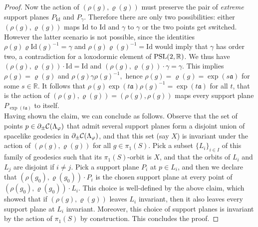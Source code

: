 \begin{proof}
    Now the action of $(\rho(g),\varrho(g))$ must preserve the pair of \textit{extreme} support planes $P_{\text{Id}}$ and $P_\gamma$. Therefore there are only two possibilities: either $(\rho(g),\varrho(g))$ maps $\text{Id}$ to $\text{Id}$ and $\gamma$ to $\gamma$ or the two points get switched. However the latter scenario is not possible, since the identities $\rho(g)\varrho\text{Id}(g)^{-1}=\gamma$ and $\rho(g)\varrho(g)^{-1}=\text{Id}$ would imply that $\gamma$ has order two, a contradiction for a loxodormic element of $\text{PSL}(2,\mathbb{R})$. We thus have $(\rho(g),\varrho(g))\cdot \text{Id}=\text{Id}$ and $(\rho(g),\varrho(g))\cdot\gamma=\gamma$. This implies $\rho(g)=\varrho(g)$ and $\rho(g)\gamma\rho(g)^{-1},$ hence $\rho(g)=\varrho(g)=\exp(s\mathfrak{a})$ for some $s\in\mathbb{R}.$ It follows that $\rho(g)\exp(t\mathfrak{a})\rho(g)^{-1}=\exp(t\mathfrak{a})$ for all $t$, that is the action of $(\rho(g),\varrho(g))=(\rho(g),\rho(g))$ maps every support plane $P_{\exp(t\mathfrak{a})}$ to itself. \\
    Having shown the claim, we can conclude as follows. Observe that the set of points $p\in\partial_\pm\mathcal{C}(\Lambda_\varphi)$ that admit several support planes form a disjoint union of spacelike geodesics in $\partial_\pm\mathcal{C}(\Lambda_\varphi)$, and that this set (say $X$) is invariant under the action of $(\rho(g),\varrho(g))$ for all $g\in\pi_1(S)$. Pick a subset $\{L_i\}_{i\in I}$ of this family of geodesics such that its $\pi_1(S)$-orbit is $X$, and that the orbits of $L_i$ and $L_j$ are disjoint if $i\neq j$. Pick a support plane $P_i$ at $p\in L_i$, and then we declare that $(\rho(g_0),\varrho(g_0))\cdot P_i$ is the chosen support plane at every point of $(\rho(g_0),\varrho(g_0))\cdot L_i$. This choice is well-defined by the above claim, which showed that if $(\rho(g),\varrho(g))$ leaves $L_i$ invariant, then it also leaves every support plane at $L_i$ invariant. Moreover, this choice of support planes is invariant by the action of $\pi_1(S)$ by construction. This concludes the proof.
\end{proof}